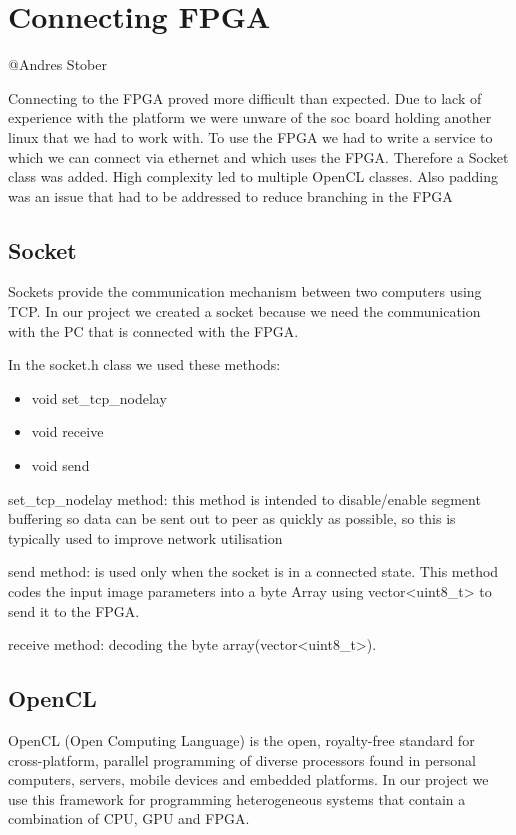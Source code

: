 \documentclass[parskip=full]{scrartcl}
\begin{document}
	
\pagebreak

\section{Connecting FPGA} \label{Connecting FPGA}
@Andres Stober

Connecting to the FPGA proved more difficult than expected. Due to lack of experience with the platform we were unware of the soc board holding another linux that we had to work with. To use the FPGA we had to write a service to which we can connect via ethernet and which uses the FPGA. Therefore a Socket class was added. High complexity led to multiple OpenCL classes. Also padding was an issue that had to be addressed to reduce branching in the FPGA

\subsection{Socket}

Sockets provide the communication mechanism between two computers using TCP. In our project we created a socket because we need the communication with the PC that is connected with the FPGA. 

In the socket.h class we used these methods:

\begin {itemize}
	\item void set\_tcp\_nodelay
	\item void receive
	\item void send
\end{itemize}

set\_tcp\_nodelay method: this method is intended to disable/enable segment buffering so data can be sent out to peer as quickly as possible, so this is typically used to improve network utilisation

send method:  is used only when the socket is in a connected state. This method codes the input image parameters into a byte Array using vector<uint8\_t> to send it to the FPGA.

receive method: decoding the byte array(vector<uint8\_t>).

\pagebreak

\subsection{OpenCL}

OpenCL (Open Computing Language) is the open, royalty-free standard for cross-platform, parallel programming of diverse processors found in personal computers, servers, mobile devices and embedded platforms. In our project we use this framework for programming heterogeneous systems that contain a combination of CPU, GPU and FPGA.
\end{document}
